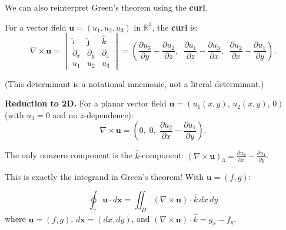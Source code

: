 \documentclass[11pt]{report}
\newcommand{\R}{\mathbb{R}}
\newcommand{\parti}[2]{\frac{\partial #1}{\partial #2}}
\begin{document}
We can also reinterpret Green's theorem using the \textbf{curl}.

\begin{definition}[Curl]
For a vector field $\mathbf{u} = (u_1, u_2, u_3)$ in $\R^3$, the \textbf{curl} is:
\[
\nabla \times \mathbf{u} = \begin{vmatrix} \hat{\imath} & \hat{\jmath} & \hat{k} \\ \partial_x & \partial_y & \partial_z \\ u_1 & u_2 & u_3 \end{vmatrix} = \left( \parti{u_3}{y} - \parti{u_2}{z}, \;\; \parti{u_1}{z} - \parti{u_3}{x}, \;\; \parti{u_2}{x} - \parti{u_1}{y} \right).
\]

(This determinant is a notational mnemonic, not a literal determinant.)
\end{definition}

\textbf{Reduction to 2D.} For a planar vector field $\mathbf{u} = (u_1(x,y), \, u_2(x,y), \, 0)$ (with $u_3 = 0$ and no $z$-dependence):
\[
\nabla \times \mathbf{u} = \left( 0, \; 0, \; \parti{u_2}{x} - \parti{u_1}{y} \right).
\]

The only nonzero component is the $\hat{k}$-component: $(\nabla \times \mathbf{u})_3 = \parti{u_2}{x} - \parti{u_1}{y}$.

This is exactly the integrand in Green's theorem! With $\mathbf{u} = (f, g)$:

\begin{theorem}
\[
\oint_\gamma \mathbf{u} \cdot d\mathbf{x} = \iint_D (\nabla \times \mathbf{u}) \cdot \hat{k} \, dx \, dy
\]
where $\mathbf{u} = (f, g)$, $d\mathbf{x} = (dx, dy)$, and $(\nabla \times \mathbf{u}) \cdot \hat{k} = g_x - f_y$.
\end{theorem}
\end{document}
